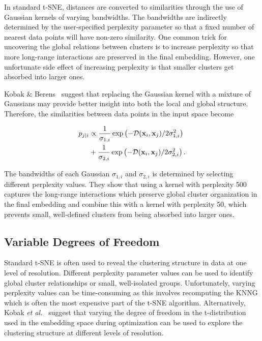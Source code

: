 \documentclass[twocolumn]{bmcart}
\begin{document}
In standard t-SNE, distances are converted to similarities through the use of Gaussian kernels of varying bandwidths. The bandwidths are indirectly determined by the user-specified perplexity parameter so that a fixed number of nearest data points will have non-zero similarity. One common trick for uncovering the global relations between clusters is to increase perplexity so that more long-range interactions are preserved in the final embedding. However, one unfortunate side effect of increasing perplexity is that smaller clusters get absorbed into larger ones.

Kobak \& Berens~\cite{kobak2019art} suggest that replacing the Gaussian kernel with a mixture of Gaussians may provide better insight into both the local and global structure. Therefore, the similarities between data points in the input space become

\begin{align}
  p_{j\mid i} &\propto \frac{1}{\sigma_{1,i}} \exp \left ( -\mathcal{D}(\mathbf{x}_i, \mathbf{x}_j ) / 2\sigma_{1,i}^2 \right ) \notag \\
  &+ \frac{1}{\sigma_{2,i}} \exp \left ( -\mathcal{D}(\mathbf{x}_i, \mathbf{x}_j ) / 2\sigma_{2,i}^2 \right ).
\end{align}

The bandwidths of each Gaussian $\sigma_{1,i}$ and $\sigma_{2,i}$ is determined by selecting different perplexity values. They show that using a kernel with perplexity 500 captures the long-range interactions which preserve global cluster organization in the final embedding and combine this with a kernel with perplexity 50, which prevents small, well-defined clusters from being absorbed into larger ones.

\subsection*{Variable Degrees of Freedom}

Standard t-SNE is often used to reveal the clustering structure in data at one level of resolution. Different perplexity parameter values can be used to identify global cluster relationships or small, well-isolated groups. Unfortunately, varying perplexity values can be time-consuming as this involves recomputing the KNNG which is often the most expensive part of the t-SNE algorithm. Alternatively,  Kobak \textit{et al.}~\cite{kobak2019heavy} suggest that varying the degree of freedom in the t-distribution used in the embedding space during optimization can be used to explore the clustering structure at different levels of resolution. 
\end{document}
